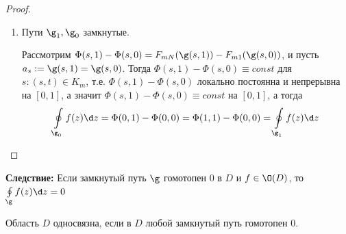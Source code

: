 \begin{proof}
\begin{enumerate}
    \item Пути $\g_1,\g_0$ замкнутые. 

    Рассмотрим $\Phi(s,1) - \Phi(s,0) = F_{mN}(\g(s,1)) - F_{m1}(\g(s,0))$, и пусть $a_s := \g(s,1)=\g(s,0)$. Тогда $\Phi(s,1) - \Phi(s,0) \equiv const$ для $s\colon (s,t)\in K_m$, т.е. $\Phi(s,1) - \Phi(s,0)$ локально постоянна и непрерывна на $[0,1]$, а значит $\Phi(s,1) - \Phi(s,0)\equiv const$ на $[0,1]$, а тогда
    \[\oint\limits_{\g_0}f(z)\d z=\Phi(0,1)-\Phi(0,0) = \Phi(1,1) - \Phi(0,0) = \oint\limits_{\g_1}f(z)\d z\]
  \end{enumerate}
\end{proof}
\textbf{Следствие:} Если замкнутый путь $\g$ гомотопен 0 в $D$ и $f\in\O(D)$, то $\oint\limits_{\g}f(z)\d z=0$ 
\begin{definition}
  Область $D$ односвязна, если в $D$ любой замкнутый путь гомотопен 0. 
\end{definition}
